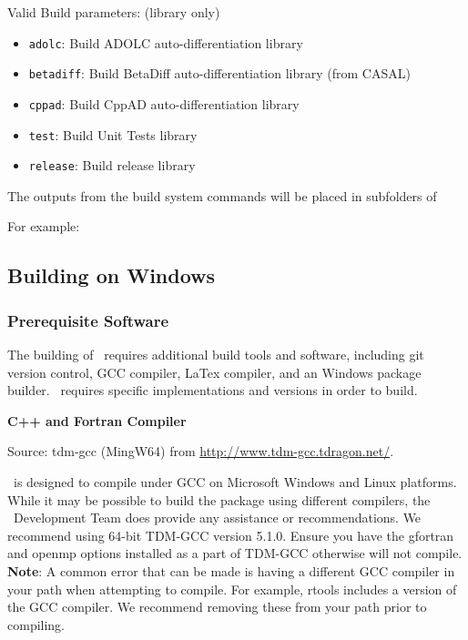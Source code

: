 Valid Build parameters: (library only)
\begin{itemize}
  \item \texttt{adolc}: Build ADOLC auto-differentiation library
  \item \texttt{betadiff}: Build BetaDiff auto-differentiation library (from CASAL)
  \item \texttt{cppad}: Build CppAD auto-differentiation library
  \item \texttt{test}: Build Unit Tests library
  \item \texttt{release}: Build release library
\end{itemize}

The outputs from the build system commands will be placed in subfolders of 

For example:





\subsection{Building on Windows}

\subsubsection{Prerequisite Software}

The building of \CNAME\ requires additional build tools and software, including git version control, GCC compiler, LaTex compiler, and an Windows package builder. \CNAME\ requires specific implementations and versions in order to build. 

\textbf{C++ and Fortran Compiler}

Source: tdm-gcc (MingW64) from \url{http://www.tdm-gcc.tdragon.net/}.

\CNAME\ is designed to compile under GCC on Microsoft Windows and Linux  platforms. While it may be possible to build the package using different compilers, the \CNAME\ Development Team does provide any assistance or recommendations. We recommend using 64-bit TDM-GCC version 5.1.0. Ensure you have the gfortran and openmp options installed as a part of TDM-GCC otherwise \CNAME will not compile. \textbf{Note}: A common error that can be made is having a different GCC compiler in your path when attempting to compile. For example, rtools includes a version of the GCC compiler. We recommend removing these from your path prior to compiling.

